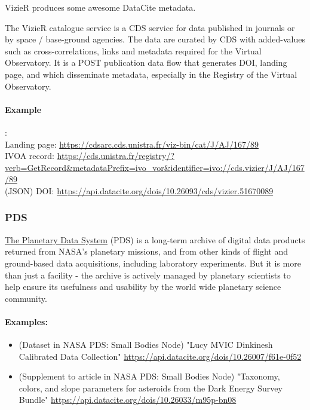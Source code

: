 \documentclass[11pt,a4paper]{ivoa}
\begin{document}
VizieR \citep{vizier} produces some awesome DataCite metadata.

The VizieR catalogue service is a CDS service for data published in journals or by space / base-ground agencies. The data are curated by CDS with added-values such as cross-correlations, links and metadata required for the Virtual Observatory. It is a POST publication data flow that generates DOI, landing page, and which disseminate metadata, especially in the Registry of the Virtual Observatory.

\paragraph{Example}:\\
Landing page: \url{https://cdsarc.cds.unistra.fr/viz-bin/cat/J/AJ/167/89}\\
IVOA record: \url{https://cds.unistra.fr/registry/?verb=GetRecord&metadataPrefix=ivo_vor&identifier=ivo://cds.vizier/J/AJ/167/89}\\
(JSON) DOI: \url{https://api.datacite.org/dois/10.26093/cds/vizier.51670089}

\subsubsection{PDS}\hypertarget{pds}{}\label{sec:pds}

\href{https://pds.nasa.gov/}{The Planetary Data System} (PDS) is a long-term archive of digital data products returned from NASA's planetary missions, and from other kinds of flight and ground-based data acquisitions, including laboratory experiments. But it is more than just a facility - the archive is actively managed by planetary scientists to help ensure its usefulness and usability by the world wide planetary science community.

\paragraph{Examples:}
\begin{itemize}
\item  (Dataset in NASA PDS: Small Bodies Node) "Lucy MVIC Dinkinesh Calibrated Data Collection" \url{https://api.datacite.org/dois/10.26007/f61e-0f52}

\item (Supplement to article in NASA PDS: Small Bodies Node) "Taxonomy, colors, and slope parameters for asteroids from the Dark Energy Survey Bundle" \url{https://api.datacite.org/dois/10.26033/m95p-bn08}

\end{itemize}
\end{document}
